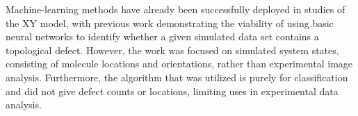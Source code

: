 \documentclass[prl,reprint,showpacs,floatfix,nofootinbib]{revtex4-1}
\begin{document}
Machine-learning methods have already been successfully deployed in studies of the XY model, with previous work demonstrating the viability of using basic neural networks to identify whether a given simulated data set contains a topological defect\cite{walters_machine_2019}. However, the work was focused on simulated system states, consisting of molecule locations and orientations, rather than experimental image analysis. Furthermore, the algorithm that was utilized is purely for classification and did not give defect counts or locations, limiting uses in experimental data analysis.





\end{document}
